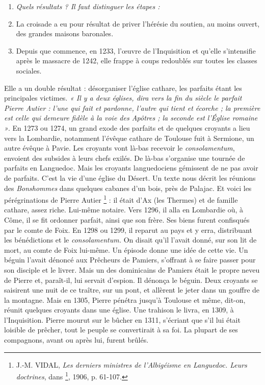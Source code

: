 \documentclass[french,twoside]{book} %
\newlength{\listmod}
\newcommand{\listhead}[1]{\hspace{-1\listmod}\emph{#1}}
\begin{document}
\label{p108}
\begin{enumerate}[itemsep=0pt,]
\item[]\listhead{Quels résultats ? Il faut distinguer les étapes :}
\item La croisade a eu pour résultat de priver l’hérésie du soutien, au moins ouvert, des grandes maisons baronales.
\item Depuis que commence, en 1233, l’œuvre de l’Inquisition et qu’elle s’intensifie après le massacre de 1242, elle frappe à coups redoublés sur toutes les classes sociales.

\end{enumerate}\noindent Elle a un double résultat : désorganiser l’église cathare, les parfaits étant les principales victimes. \emph{« Il y a deux églises, dira vers la fin du siècle le parfait Pierre Autier : l’une qui fait et pardonne, l’autre qui tient et écorche ; la première est celle qui demeure fidèle à la voie des Apôtres ; la seconde est l’Église romaine »}. En 1273 ou 1274, un grand exode des parfaits et de quelques croyants a lieu vers la Lombardie, notamment l’évêque cathare de Toulouse fuit à Sermione, un autre évêque à Pavie. Les croyants vont là-bas recevoir le {\itshape consolamentum}, envoient des subsides à leurs chefs exilés. De là-bas s’organise une tournée de parfaits en Languedoc. Mais les croyants languedociens gémissent de ne pas avoir de parfaits. C’est la vie d’une église du Désert. Un texte nous décrit les réunions des {\itshape Bonshommes} dans quelques cabanes d’un bois, près de Palajac. Et voici les pérégrinations de Pierre Autier \footnote{ J.-M. VIDAL, {\itshape Les derniers ministres de l’Albigéisme en Languedoc. Leurs doctrines}, dans \href{http://gallica.bnf.fr/document?O=N016999}{}\footnote{\href{http://gallica.bnf.fr/document?O=N016999}{\url{http://gallica.bnf.fr/document?O=N016999}}}, 1906, p. 61-107.} : il était d’Ax (les Thermes) et de famille cathare, assez riche. Lui-même notaire. Vers 1296, il alla en Lombardie où, à Côme, il se fit ordonner parfait, ainsi que son frère. Ses biens furent confisqués par le comte de Foix. En 1298 ou 1299, il reparut au pays et y erra, distribuant les bénédictions et le {\itshape consolamentum.} On disait qu’il l’avait donné, sur son lit de mort, au comte de Foix lui-même. Un épisode donne une idée de cette vie. Un béguin l’avait dénoncé aux Prêcheurs de Pamiers, s’offrant à se faire passer pour son disciple et le livrer. Mais un des dominicains de Pamiers était le propre neveu de Pierre et, paraît-il, lui servait d’espion. Il dénonça le béguin. Deux croyants se saisirent une nuit de ce traître, sur un pont, et allèrent le jeter dans un gouffre de la montagne. Mais en 1305, Pierre pénétra jusqu’à Toulouse et même, dit-on, réunit quelques croyants dans une église. Une trahison le livra, en 1309, à l’Inquisition. Pierre mourut sur le bûcher en 1311, s’écriant que s’il lui était loisible de prêcher, tout le peuple se convertirait à sa foi. La plupart de ses compagnons, avant ou après lui, furent brûlés.\par
\end{document}
